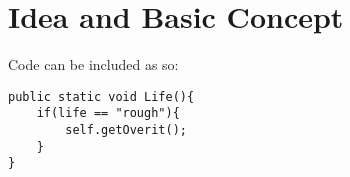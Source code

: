 \chapter{Idea and Basic Concept }

Code can be included as so:

\begin{lstlisting}
public static void Life(){
	if(life == "rough"){
		self.getOverit();
	}
}
\end{lstlisting}


